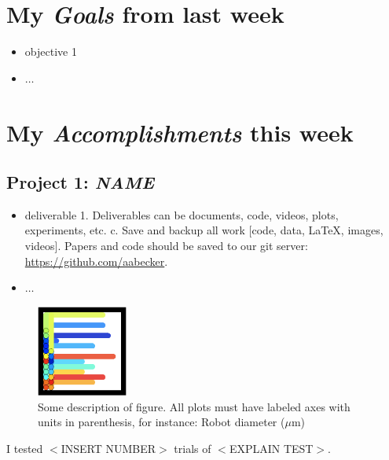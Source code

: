 \newcommand{\handoutName}{Weekly report}
\newcommand{\handoutdate}{\today}
\newcommand{\duedate}{}





\section{My \emph{Goals} from last week}
\begin{itemize}
\item objective 1
\item $\ldots$
\end{itemize}


\section{My \emph{Accomplishments} this week}

\subsection{Project 1: \emph{NAME}}

\begin{itemize}
\item deliverable 1.  Deliverables can be documents, code, videos, plots, experiments, etc. c.	Save and backup all work [code, data, LaTeX, images, videos].  Papers and code should be saved to our git server: \href{github.com/aabecker}{https://github.com/aabecker}.
\item $\ldots$
\end{itemize}

\begin{figure}[h]
\begin{center}
\includegraphics[width=3cm]{fig/CovergeSimpleEnd.png}
\caption{Some description of figure.  All plots must have labeled axes with units in parenthesis, for instance:  Robot diameter ($\mu$m)}
\end{center}
\end{figure}
I tested $<$INSERT NUMBER$>$ trials of $<$EXPLAIN TEST$>$.

